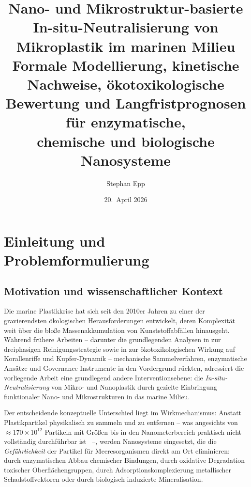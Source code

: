 ﻿\documentclass[12pt,a4paper]{article}
\title{\textbf{Nano- und Mikrostruktur-basierte In-situ-Neutralisierung von\\
Mikroplastik im marinen Milieu}\\[0.4em]
\large Formale Modellierung, kinetische Nachweise, ökotoxikologische\\
Bewertung und Langfristprognosen für enzymatische,\\
chemische und biologische Nanosysteme}
\author{Stephan Epp}
\date{20.~April 2026}
\theoremstyle{definition}
\theoremstyle{remark}
\begin{document}
\maketitle
\tableofcontents
\newpage

\section{Einleitung und Problemformulierung}
\label{sec:einleitung}

\subsection{Motivation und wissenschaftlicher Kontext}

Die marine Plastikkrise hat sich seit den 2010er Jahren zu einer der gravierendsten
ökologischen Herausforderungen entwickelt, deren Komplexität weit über die bloße
Massenakkumulation von Kunststoffabfällen hinausgeht. Während frühere Arbeiten --
darunter die grundlegenden Analysen in \cite{cleanocn_epp2026} zur dreiphasigen
Reinigungsstrategie sowie in \cite{ocnscnce_epp2026} zur ökotoxikologischen
Wirkung auf Korallenriffe und Kupfer-Dynamik -- mechanische Sammelverfahren,
enzymatische Ansätze und Governance-Instrumente in den Vordergrund rückten,
adressiert die vorliegende Arbeit eine grundlegend andere Interventionsebene:
die \emph{In-situ-Neutralisierung} von Mikro- und Nanoplastik durch gezielte
Einbringung funktionaler Nano- und Mikrostrukturen in das marine Milieu.

Der entscheidende konzeptuelle Unterschied liegt im Wirkmechanismus:
Anstatt Plastikpartikel physikalisch zu sammeln und zu entfernen -- was angesichts
von $\approx 170 \times 10^{12}$ Partikeln mit Größen bis in den Nanometerbereich
praktisch nicht vollständig durchführbar ist~\cite{eriksen2014plastic} --,
werden Nanosysteme eingesetzt, die die \emph{Gefährlichkeit} der Partikel für
Meeresorganismen direkt am Ort eliminieren: durch enzymatischen Abbau chemischer
Bindungen, durch oxidative Degradation toxischer Oberflächengruppen, durch
Adsorptionskomplexierung metallischer Schadstoffvektoren oder durch biologisch
induzierte Mineralisation.
\end{document}
